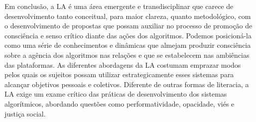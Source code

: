 Em conclusão, a LA é uma área emergente e transdisciplinar que carece de
desenvolvimento tanto conceitual, para maior clareza, quanto
metodológico, com o desenvolvimento de propostas que possam auxiliar no
processo de promoção de consciência e senso crítico diante das ações dos
algoritmos. Podemos posicioná-la como uma série de conhecimentos e
dinâmicas que almejam produzir consciência sobre a agência dos
algoritmos nas relações e que se estabelecem nas ambiências das
plataformas. As diferentes abordagens da LA costumam emprazar modos
pelos quais os sujeitos possam utilizar estrategicamente esses sistemas
para alcançar objetivos pessoais e coletivos. Diferente de outras formas
de literacia, a LA exige um exame crítico das práticas de
desenvolvimento dos sistemas algorítmicos, abordando questões como
performatividade, opacidade, viés e justiça social.
